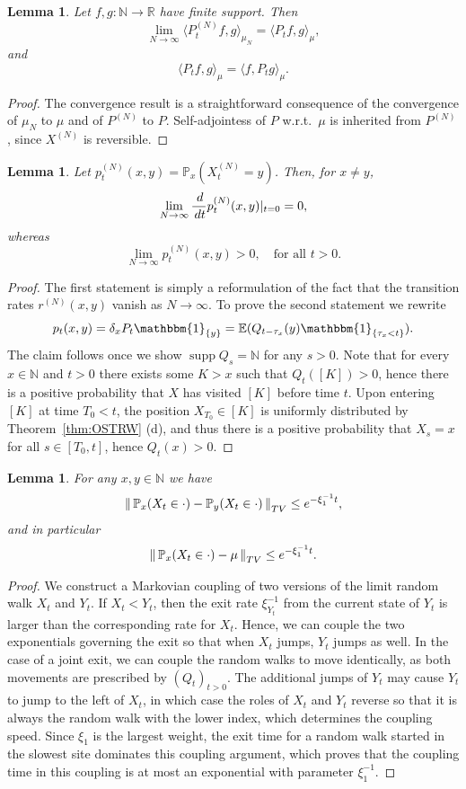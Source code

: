 \documentclass[11pt,a4paper]{scrartcl}
\numberwithin{equation}{section}
\theoremstyle{plain}
\newtheorem{lemma}[theorem]{Lemma}
\theoremstyle{definition}
\theoremstyle{remark}
\DeclareMathOperator{\supp}{supp}
\newcommand{\bE}{\ensuremath{\mathbb{E}}}
\newcommand{\bN}{\ensuremath{\mathbb{N}}}
\newcommand{\bP}{\ensuremath{\mathbb{P}}}
\newcommand{\bR}{\ensuremath{\mathbb{R}}}
\newcommand{\ind}{\ensuremath{\mathbbm{1}}}
\newcommand{\norm}[1]{\left\Vert \, #1 \, \right\Vert}
\newcommand{\di}{\,\textup{d}}
\begin{document}
\begin{lemma}
Let $f,g:\bN \to \bR$ have finite support. Then 
\[ \lim_{N\to\infty} \langle P_t^{(N)} f, g\rangle_{\mu_N} = \langle P_t f, g\rangle_{\mu},\]
and 
\[\langle P_t f, g\rangle_{\mu} = \langle f, P_t g\rangle_{\mu}.\]
\end{lemma}
\begin{proof}
The convergence result is a straightforward consequence of the convergence of $\mu_N$ to $\mu$ and of $P^{(N)}$ to $P$. Self-adjointess of $P$ w.r.t.\ $\mu$ is inherited from $P^{(N)}$, since $X^{(N)}$ is reversible.
\end{proof}
\begin{lemma}
Let $p_t^{(N)}(x,y) = \bP_x(X_t^{(N)}=y)$. Then, for $x\neq y$, 
$$ \lim_{N\to\infty}\frac{\di}{\di t}p_t^{(N)}(x,y)|_{t=0}= 0, $$
whereas $$\lim_{N\to\infty}p_t^{(N)}(x,y) > 0, \quad \text{for all }t>0.$$
\end{lemma}
\begin{proof}
The first statement is simply a reformulation of the fact that the transition rates $r^{(N)}(x,y)$ vanish as $N\to\infty$. To prove the second statement we rewrite$$
p_t(x,y)=\delta_xP_t\ind_{\{y\}} = \bE(Q_{t-\tau_x}(y)\ind_{\{\tau_x<t\}}).
$$
The claim follows once we show $\supp Q_s=\bN$ for any $s>0$. Note that for every $x\in\bN$ and $t>0$ there exists some $K>x$ such that $Q_{t}([K])>0$, hence there is a positive probability that $X$ has visited $[K]$ before time $t$. Upon entering $[K]$ at time $T_0<t$, the position $X_{T_0}\in[K]$ is uniformly distributed by Theorem~\ref{thm:OSTRW} (d), and thus there is a positive probability that $X_s=x$ for all $s\in[T_0,t]$, hence $Q_t(x)>0$.
\end{proof}
\begin{lemma}\label{lem:coupling2RW}For any $x,y\in \bN$ we have
\begin{align}
\norm{\bP_x(X_t \in \cdot) - \bP_y(X_t \in \cdot)}_{\textup{TV}} \leq e^{-\xi_{1}^{-1}t},
\end{align}
and in particular
\begin{align}
\norm{\bP_x(X_t \in \cdot) - \mu}_{\textup{TV}} \leq e^{-\xi_1^{-1}t}.
\end{align}
\end{lemma}
\begin{proof}
We construct a Markovian coupling of two versions of the limit random walk $X_t$ and $Y_t$. If $X_t<Y_t$, then the exit rate $\xi_{Y_t}^{-1}$ from the current state of $Y_t$ is larger than the corresponding rate for $X_t$. Hence, we can couple the two exponentials governing the exit so that when $X_t$ jumps, $Y_t$ jumps as well. In the case of a joint exit, we can couple the random walks to move identically, as both movements are prescribed by $(Q_t)_{t>0}$. The additional jumps of $Y_t$ may cause $Y_t$ to jump to the left of $X_t$, in which case the roles of $X_t$ and $Y_t$ reverse so that it is always the random walk with the lower index, which determines the coupling speed. Since $\xi_{1}$ is the largest weight, the exit time for a random walk started in the slowest site dominates this coupling argument, which proves that the coupling time in this coupling is at most an exponential with parameter $\xi_1^{-1}$.\end{proof}
\end{document}
